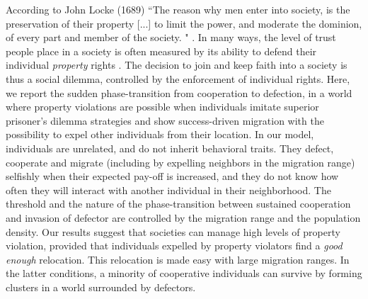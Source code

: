 According to John Locke (1689) ``The reason why men enter into society, is the preservation of their property [...] to limit the power, and moderate the dominion, of every part and member of the society.
" \cite{locke2014second}. In many ways, the level of trust people place in a society is often measured by its ability to defend their individual {\it property} rights \cite{}. The decision to join and keep faith into a society is thus a social dilemma, controlled by the enforcement of individual rights. Here, we report the sudden phase-transition from cooperation to defection, in a world where property violations are possible when individuals imitate superior prisoner's dilemma strategies and show success-driven migration with the possibility to expel other individuals from their location. In our model, individuals are unrelated, and do not inherit behavioral traits.  They defect, cooperate and migrate (including by expelling neighbors in the migration range) selfishly when their expected pay-off is increased, and they do not know how often they will interact with another individual in their neighborhood. The threshold and the nature of the phase-transition between sustained cooperation and invasion of defector are controlled by the migration range and the population density. Our results suggest that societies can manage high levels of property violation, provided that individuals expelled by property violators find a {\it good enough} relocation. This relocation is made easy with large migration ranges. In the latter conditions, a minority of cooperative individuals can survive by forming clusters in a world surrounded by defectors.\\
